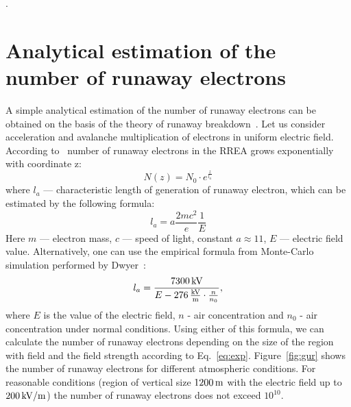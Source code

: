 \documentclass[doublecol,linenumbers]{epl2} %
\begin{document}
.

\section{Analytical estimation of the number of runaway electrons}

A simple analytical estimation of the number of runaway electrons can be obtained on the basis of the theory of runaway breakdown~\cite{Gurevich:2001}. Let us consider acceleration and avalanche multiplication of electrons in uniform electric field. According to~\cite{Gurevich:2001} number of runaway electrons in the RREA grows exponentially with coordinate z:
\begin{equation}
\label{eq:exp}
    N(z) = N_0 \cdot e^{\frac{z}{l_a}}
\end{equation}
where $l_a$ --- characteristic length of generation of runaway electron, which can be estimated by the following formula:
\begin{equation}
    l_a = a\frac{2 m c^{2}}{e} \frac{1}{E}
\end{equation}
Here $m$ --- electron mass, $c$ --- speed of light, constant $a \approx 11$, $E$ --- electric field value.
Alternatively, one can use the empirical formula from Monte-Carlo simulation performed by Dwyer~\cite{Dwyer2007}:
\begin{equation}
\label{eq:dwyer}
    l_a = \frac{7300\un{kV}}{E - 276\un{ \frac{kV}{m}} \cdot \frac{n}{n_0}},
\end{equation}
where $E$ is the value of the electric field, $n$ - air concentration and $n_0$ - air concentration under normal conditions. Using either of this formula, we can calculate the number of runaway electrons depending on the size of the region with field and the field strength according to Eq.~\ref{eq:exp}. 
Figure~\ref{fig:gur} shows the number of runaway electrons for different atmospheric conditions. For reasonable conditions  (region of vertical size $1200\un{m}$ with the electric field up to $200\un{kV/m}$) the number of runaway electrons does not exceed $10^{10}$.
\end{document}

